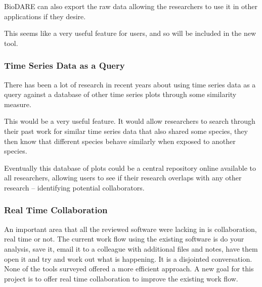 BioDARE can also export the raw data allowing the researchers to use it in other applications if they desire.

This seems like a very useful feature for users, and so will be included in the new tool.

\subsubsection{Time Series Data as a Query}

There has been a lot of research in recent years about using time series data as a query against a database of other time series plots through some similarity measure.

This would be a very useful feature.  It would allow researchers to search through their past work for similar time series data that also shared some species, they then know that different species behave similarly when exposed to another species.

Eventually this database of plots could be a central repository online available to all researchers, allowing users to see if their research overlaps with any other research -- identifying potential collaborators.

\subsubsection{Real Time Collaboration}

An important area that all the reviewed software were lacking in is collaboration, real time or not.  The current work flow using the existing software is do your analysis, save it, email it to a colleague with additional files and notes, have them open it and try and work out what is happening.  It is a disjointed conversation.  None of the tools surveyed offered a more efficient approach.  A new goal for this project is to offer real time collaboration to improve the existing work flow.
